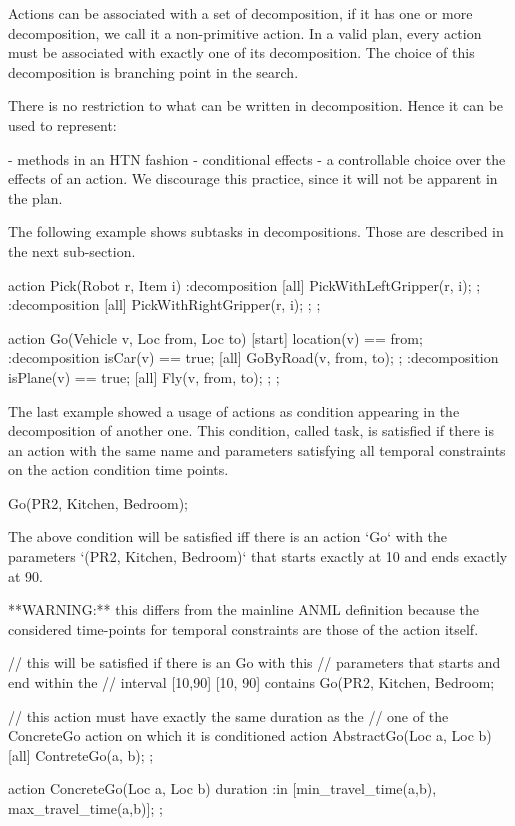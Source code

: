 
Actions can be associated with a set of decomposition, if it has one or more decomposition, we call it a non-primitive action.
In a valid plan, every action must be associated with exactly one of its decomposition.
The choice of this decomposition is branching point in the search.

There is no restriction to what can be written in decomposition. Hence it can be used to represent:

- methods in an HTN fashion
- conditional effects
- a controllable choice over the effects of an action. We discourage this practice, since it will not be apparent in the plan.

The following example shows subtasks in decompositions. Those are described in the next sub-section.

\begin{anmlcode}
action Pick(Robot r, Item i) {
  :decomposition{
    [all] PickWithLeftGripper(r, i);
  };
  :decomposition{
    [all] PickWithRightGripper(r, i);
  };
};

action Go(Vehicle v, Loc from, Loc to) {
  [start] location(v) == from;
  :decomposition{
      isCar(v) == true;
      [all] GoByRoad(v, from, to);
  };
  :decomposition{
    isPlane(v) == true;
    [all] Fly(v, from, to);
  };
};
\end{anmlcode}


The last example showed a usage of actions as condition appearing in the decomposition of another one.
This condition, called task, is satisfied if there is an action with the same name and parameters satisfying all temporal constraints on the action condition time points.
\begin{anmlcode}
[10,90] Go(PR2, Kitchen, Bedroom);
\end{anmlcode}
  
The above condition will be satisfied iff there is an action `Go` with the parameters `(PR2, Kitchen, Bedroom)` that starts exactly at 10 and ends exactly at 90.

**WARNING:** this differs from the mainline ANML definition because the considered time-points for temporal constraints are those of the action itself.
\begin{anmlcode}
// this will be satisfied if there is an Go with this
// parameters that starts and end within the
// interval [10,90]
[10, 90] contains Go(PR2, Kitchen, Bedroom;

// this action must have exactly the same duration as the
// one of the ConcreteGo action on which it is conditioned 
action AbstractGo(Loc a, Loc b) {
  [all] ContreteGo(a, b);
};

action ConcreteGo(Loc a, Loc b) {
  duration :in [min_travel_time(a,b), max_travel_time(a,b)];
};
\end{anmlcode}

